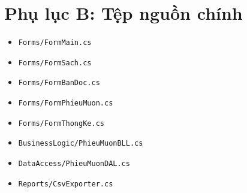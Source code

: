 \documentclass[12pt,a4paper]{article}
\begin{document}
\section{Phụ lục B: Tệp nguồn chính}
\begin{itemize}[leftmargin=1.5cm]
    \item \texttt{Forms/FormMain.cs}
    \item \texttt{Forms/FormSach.cs}
    \item \texttt{Forms/FormBanDoc.cs}
    \item \texttt{Forms/FormPhieuMuon.cs}
    \item \texttt{Forms/FormThongKe.cs}
    \item \texttt{BusinessLogic/PhieuMuonBLL.cs}
    \item \texttt{DataAccess/PhieuMuonDAL.cs}
    \item \texttt{Reports/CsvExporter.cs}
\end{itemize}
\end{document}
